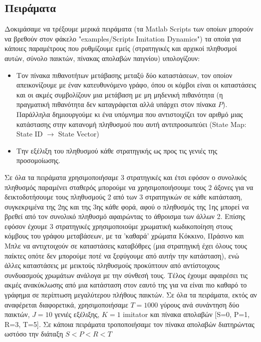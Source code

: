 \documentclass[12pt]{report}
\begin{document}
\subsection{Πειράματα}
Δοκιμάσαμε να τρέξουμε μερικά πειράματα (τα \foreignlanguage{english}{Matlab Scripts} των οποίων μπορούν να βρεθούν στον φάκελο \foreignlanguage{english}{"examples/Scripts Imitation Dynamics"}) τα οποία για κάποιες παραμέτρους που ρυθμίζουμε εμείς (στρατηγικές και αρχικοί πληθυσμοί αυτών, σύνολο παικτών, πίνακας απολαβών παιγνίου) υπολογίζουν:
\begin{itemize}
    \item Τον πίνακα πιθανοτήτων μετάβασης μεταξύ δύο καταστάσεων, τον οποίον απεικονίζουμε με έναν κατευθυνόμενο γράφο, όπου οι κόμβοι είναι οι καταστάσεις και οι ακμές συμβολίζουν μια μετάβαση με μη μηδενική πιθανότητα (η πραγματική πιθανότητα δεν καταγράφεται αλλά υπάρχει στον πίνακα $P$). Παράλληλα δημιουργούμε κι ένα υπόμνημα που αντιστοιχίζει τον αριθμό μιας κατάστασης στην κατανομή πληθυσμού που αυτή αντιπροσωπεύει (\foreignlanguage{english}{State Map: State ID $\xrightarrow{}$ State Vector})
    \item Την εξέλιξη του πληθυσμού κάθε στρατηγικής ως προς τις γενιές της προσομοίωσης.
\end{itemize}
Σε όλα τα πειράματα χρησιμοποιήσαμε 3 στρατηγικές και έτσι εφόσον ο συνολικός πληθυσμός παραμένει σταθερός μπορούμε να χρησιμοποιήσουμε τους 2 άξονες για να δεικτοδοτήσουμε τους πληθυσμούς 2 από των 3 στρατηγικών σε κάθε κατάσταση, συγκεκριμένα της 2ης και της 3ης κάθε φορά, αφού ο πληθυσμός της 1ης μπορεί να βρεθεί από τον συνολικό πληθυσμό αφαιρώντας το άθροισμα των άλλων 2. Επίσης εφόσον έχουμε 3 στρατηγικές χρησιμοποιούμε χρωματική κωδικοποίηση στους κόμβους του γράφου μεταβάσεων, με τα 'καθαρά' χρώματα Κόκκινο, Πράσινο και Μπλε να αντιχτοιχούν σε καταστάσεις καταβόθρες (μια στρατηγική έχει όλους τους παίκτες οπότε δεν μπορούμε ποτέ να ξεφύγουμε από αυτήν την κατάσταση), ενώ άλλες καταστάσεις με μεικτούς πληθυσμούς προκύπτουν από αντίστοιχους συνδυασμούς χρωμάτων ανάλογα με την σύνθεσή τους. Τέλος έχουμε αφαιρέσει τις ακμές ανακύκλωσης από μια κατάσταση στον εαυτό της για να είναι πιο καθαρό το γράφημα σε περίπτωση μεγαλύτερου πλήθους παικτών.
Σε όλα τα πειράματα, εκτός αν αναφέρεται διαφορετικά, χρησιμοποιήσαμε $T=1000$ γύρους ανά συνάντηση δύο παικτών, $J=10$ γενιές εξέλιξης, $K=1$ \foreignlanguage{english}{imitator} και πίνακα απολαβών [S=0, P=1, R=3, T=5]. Σε κάποια πειράματα τροποποιήσαμε τον πίνακα απολαβών διατηρώντας ωστόσο την διάταξη $S<P<R<T$
\end{document}
